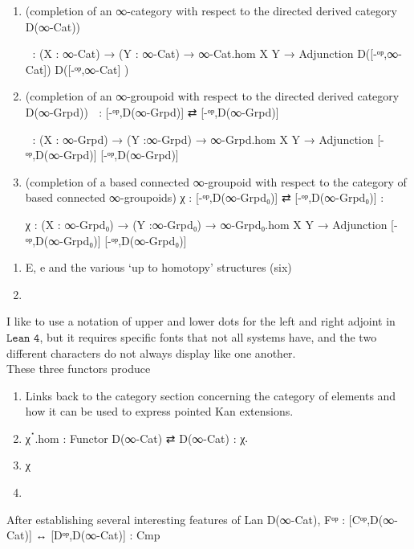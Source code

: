 \documentclass{book}
\theoremstyle{definition}
\begin{document}
{\begin{enumerate}
\item (completion of an ∞-category with respect to the directed derived category D(∞-Cat))
\begin{center}
 χ⃗  : (X : ∞-Cat) → (Y : ∞-Cat) → ∞-Cat.hom X Y → Adjunction D([-ᵒᵖ,∞-Cat]) D([-ᵒᵖ,∞-Cat] )
\end{center}
\item (completion of an ∞-groupoid with respect to the directed derived category D(∞-Grpd)) χ⃡ : [-ᵒᵖ,D(∞-Grpd)] ⇄ [-ᵒᵖ,D(∞-Grpd)]
\begin{center}
 χ⃡ : (X : ∞-Grpd) → (Y :∞-Grpd) → ∞-Grpd.hom X Y → Adjunction [-ᵒᵖ,D(∞-Grpd)] [-ᵒᵖ,D(∞-Grpd)]
\end{center}
\item (completion of a based connected ∞-groupoid with respect to the category of based connected ∞-groupoids) χ : [-ᵒᵖ,D(∞-Grpd₀)] ⇄ [-ᵒᵖ,D(∞-Grpd₀)] :
\begin{center}
 χ : (X : ∞-Grpd₀) → (Y :∞-Grpd₀) → ∞-Grpd₀.hom X Y → Adjunction [-ᵒᵖ,D(∞-Grpd₀)] [-ᵒᵖ,D(∞-Grpd₀)]
\end{center}
\end{enumerate}



\begin{enumerate}
\item E, e and the various `up to homotopy' structures (six)
\item 
\end{enumerate}




I like to use a notation of upper and lower dots for the left and right adjoint in $\texttt{Lean 4}$, but it requires specific fonts that not all systems have, and the two different characters do not always display like one another.\\

These three functors produce 

\begin{enumerate}
\item Links back to the category section concerning the category of elements and how it can be used to express pointed Kan extensions.
\item χॱ.hom : Functor D(∞-Cat) ⇄ D(∞-Cat) : χ𛲔
\item χ
\item 
\end{enumerate}

After establishing several interesting features of Lan D(∞-Cat),  Fᵒᵖ : [Cᵒᵖ,D(∞-Cat)] ↔ [Dᵒᵖ,D(∞-Cat)] : Cmp



}
\end{document}
